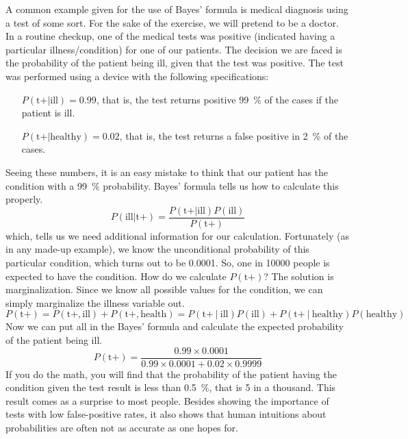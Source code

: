 A common example given for the use of Bayes' formula is
medical diagnosis using a test of some sort.
For the sake of the exercise,
we will pretend to be a doctor.
In a routine checkup,
one of the medical tests was positive
(indicated having a particular illness/condition)
for one of our patients.
The decision we are faced is the probability of the patient being ill,
given that the test was positive.
The test was performed using a device with the following specifications:
\begin{itemize}[nosep,labelindent=1em,labelwidth=1.3cm,labelsep*=1em,leftmargin =!]
  \item[$P(\text{t+}|\text{ill}) = 0.99$,] that is,
    the test returns positive \SI{99}{\percent} 
    of the cases if the patient is ill.
  \item[$P(\text{t+}|\text{healthy}) = 0.02$,] that is,
    the test returns a false positive in \SI{2}{\percent} of the cases.
\end{itemize}
Seeing these numbers,
it is an easy mistake to think that our patient has the condition
with a \SI{99}{\percent} probability.
Bayes' formula tells us how to calculate this properly.
\[
  P(\text{ill}|\text{t+}) = 
    \frac{P(\text{t+}|\text{ill})P(\text{ill})}
         {P(\text{t+})}
\]
which, tells us we need additional information for our calculation.
Fortunately (as in any made-up example),
we know the unconditional probability of this particular condition,
which turns out to be \num[round-precision=5]{0.0001}.
So, one in \num{10000} people is expected to have the condition.
How do we calculate $P(\text{t+})$?
The solution is marginalization.
Since we know all possible values for the condition,
we can simply marginalize the illness variable out.
\[
  P(\text{t+}) = P(\text{t+}, \text{ill}) + P(\text{t+}, \text{health})
               = P(\text{t+}\:\vert\:\text{ill}) P(\text{ill}) + 
                 P(\text{t+}\:\vert\:\text{healthy}) P(\text{healthy})
\]
Now we can put all in the Bayes' formula and calculate the expected
probability of the patient being ill.
\[
  P(\text{t+}) = \frac{0.99 \times{} 0.0001}
                      {0.99 \times{} 0.0001 + 0.02 \times{} 0.9999}
\]
If you do the math,
you will find that
the probability of the patient having the condition given the test result is
less than \SI{0.5}{\percent}, that is \num{5} in a thousand.
This result comes as a surprise to most people.
Besides showing the importance of tests with low false-positive rates,
it also shows that human intuitions about probabilities are often
not as accurate as one hopes for.

